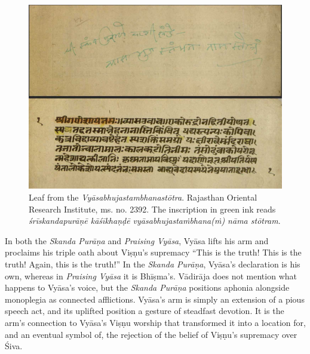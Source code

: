 \begin{figure}[ht!]\label{fig3}\centering

\includegraphics[width=\textwidth]{images/figure-03.jpg}
\caption{Leaf from the \emph{{Vyāsabhujastambhanastōtra}}. Rajasthan Oriental Research Institute, ms. no. 2392. The inscription in green ink reads \emph{śrīskandapurāṇē kāśīkhaṇḍē vyāsabhujastaṁbhana(ṁ) nāma stōtram}.}

\end{figure}


In both the \emph{{Skanda Purāṇa}} and \emph{Praising Vyāsa}, Vyāsa lifts his arm and proclaims his triple oath about Viṣṇu’s supremacy  \Dash  “This is the truth! This is the truth! Again, this is the truth!” In the \emph{{Skanda Purāṇa}}, Vyāsa’s declaration is his own, whereas in \emph{Praising Vyāsa} it is Bhīṣma’s. Vādirāja does not mention what happens to Vyāsa’s voice, but the \emph{{Skanda Purāṇa}} positions aphonia alongside monoplegia as connected afflictions. Vyāsa’s arm is simply an extension of a pious speech act, and its uplifted position a gesture of steadfast devotion. It is the arm’s connection to Vyāsa’s Viṣṇu worship that transformed it into a location for, and an eventual symbol of, the rejection of the belief of Viṣṇu's supremacy over Śiva.


